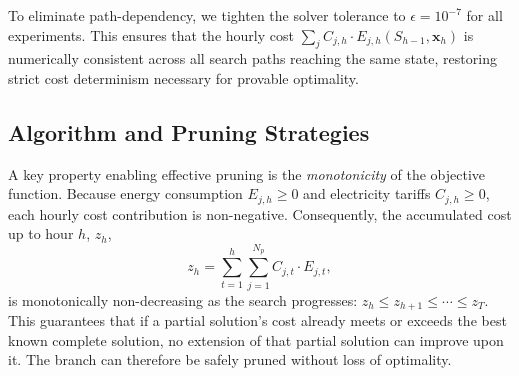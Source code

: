 \documentclass[a4paper,fleqn]{cas-dc}
\begin{document}
To eliminate path-dependency, we tighten the solver tolerance to $\epsilon = 10^{-7}$ for all experiments. This ensures that the hourly cost $\sum_j C_{j,h} \cdot E_{j,h}(S_{h-1}, \mathbf{x}_h)$ is numerically consistent across all search paths reaching the same state, restoring strict cost determinism necessary for provable optimality.

\subsection{Algorithm and Pruning Strategies}

A key property enabling effective pruning is the \emph{monotonicity} of the objective function. Because energy consumption $E_{j,h} \ge 0$ and electricity tariffs $C_{j,h} \ge 0$, each hourly cost contribution is non-negative. Consequently, the accumulated cost up to hour $h$, $z_h$,
\[
	z_h = \sum_{t=1}^{h} \sum_{j=1}^{N_p} C_{j,t} \cdot E_{j,t},
\]
is monotonically non-decreasing as the search progresses: $z_h \le z_{h+1} \le \cdots \le z_T$. This guarantees that if a partial solution's cost already meets or exceeds the best known complete solution, no extension of that partial solution can improve upon it. The branch can therefore be safely pruned without loss of optimality.
\end{document}
